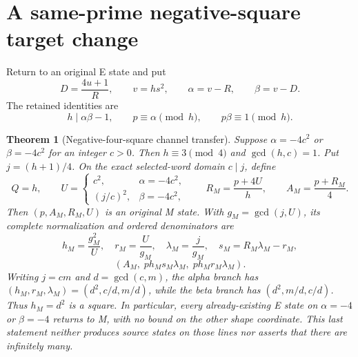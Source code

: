 \documentclass[11pt]{article}
\newtheorem{theorem}{Theorem}[section]
\theoremstyle{definition}\newtheorem{definition}[theorem]{Definition}
\theoremstyle{remark}\newtheorem{remark}[theorem]{Remark}
\begin{document}
\section{A same-prime negative-square target change}

Return to an original E state and put
\begin{equation}
 D=\frac{4u+1}{R},\qquad v=hs^2,\qquad
 \alpha=v-R,\qquad\beta=v-D.                           \tag{EZ28r}
\end{equation}
The retained identities are
\begin{equation}
 h\mid\alpha\beta-1,\qquad p\equiv\alpha\pmod h,
 \qquad p\beta\equiv1\pmod h.                         \tag{EZ28s}
\end{equation}

\begin{theorem}[Negative-four-square channel transfer]
Suppose \(\alpha=-4c^2\) or \(\beta=-4c^2\) for an integer \(c>0\).  Then
\(h\equiv3\pmod4\) and \(\gcd(h,c)=1\).  Put \(j=(h+1)/4\).  On the exact
selected-word domain \(c\mid j\), define
\begin{equation}
 Q=h,\qquad
 U=\begin{cases}c^2,&\alpha=-4c^2,\\(j/c)^2,&\beta=-4c^2,\end{cases}
 \qquad R_M=\frac{p+4U}{h},\qquad A_M=\frac{p+R_M}{4}.  \tag{EZ28t}
\end{equation}
Then \((p,A_M,R_M,U)\) is an original M state.  With
\(g_M=\gcd(j,U)\), its complete normalization and ordered denominators are
\begin{equation}
 h_M=\frac{g_M^2}{U},\quad r_M=\frac{U}{g_M},\quad
 \lambda_M=\frac{j}{g_M},\quad s_M=R_M\lambda_M-r_M,   \tag{EZ28u}
\end{equation}
\begin{equation}
 \boxed{(A_M,\;p h_Ms_M\lambda_M,\;p h_Mr_M\lambda_M).} \tag{EZ28v}
\end{equation}
Writing \(j=cm\) and \(d=\gcd(c,m)\), the alpha branch has
\((h_M,r_M,\lambda_M)=(d^2,c/d,m/d)\), while the beta branch has
\((d^2,m/d,c/d)\).  Thus \(h_M=d^2\) is a square.  In particular, every
already-existing E state on \(\alpha=-4\) or \(\beta=-4\) returns to M, with
no bound on the other shape coordinate.  This last statement neither produces
source states on those lines nor asserts that there are infinitely many.
\end{theorem}
\end{document}
